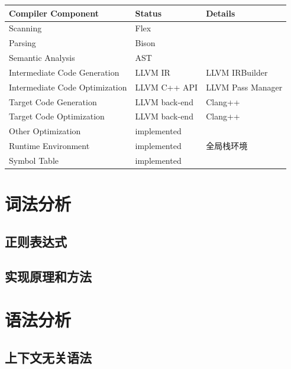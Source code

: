 \documentclass{article}
\begin{document}
\begin{table}[H]
    \begin{tabular}{|l|l|l|}
        \hline
        \textbf{Compiler Component}    & \textbf{Status} & \textbf{Details}   \\ \hline
        Scanning                       & Flex            &                    \\ \hline
        Parsing                        & Bison           &                    \\ \hline
        Semantic Analysis              & AST             &                    \\ \hline
        Intermediate Code Generation   & LLVM IR         & LLVM IRBuilder     \\ \hline
        Intermediate Code Optimization & LLVM C++ API    & LLVM Pass Manager  \\ \hline
        Target Code Generation         & LLVM back-end   & Clang++            \\ \hline
        Target Code Optimization       & LLVM back-end   & Clang++            \\ \hline
        Other Optimization             & implemented     &                    \\ \hline
        Runtime Environment            & implemented     & 全局栈环境          \\ \hline
        Symbol Table                   & implemented     &                    \\ \hline
    \end{tabular}
\end{table}

\section{词法分析}
\subsection{正则表达式}
\subsection{实现原理和方法}

\section{语法分析}
\subsection{上下文无关语法}
\end{document}
